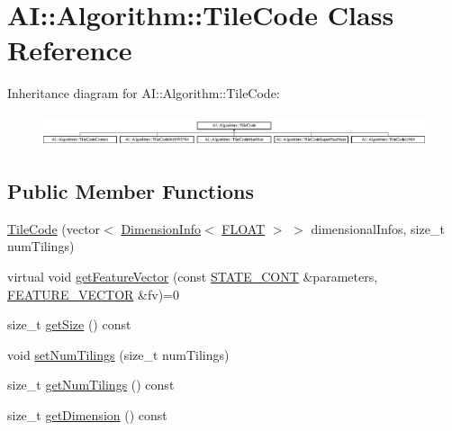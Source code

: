 \hypertarget{classAI_1_1Algorithm_1_1TileCode}{\section{A\-I\-:\-:Algorithm\-:\-:Tile\-Code Class Reference}
\label{classAI_1_1Algorithm_1_1TileCode}
}
Inheritance diagram for A\-I\-:\-:Algorithm\-:\-:Tile\-Code\-:\begin{figure}[H]
\begin{center}
\leavevmode
\includegraphics[height=0.957265cm]{classAI_1_1Algorithm_1_1TileCode}
\end{center}
\end{figure}
\subsection*{Public Member Functions}
\begin{DoxyCompactItemize}
\item 
\hyperlink{classAI_1_1Algorithm_1_1TileCode_a5c143dc170aca9699e68c808d91f1ffe}{Tile\-Code} (vector$<$ \hyperlink{classAI_1_1Algorithm_1_1DimensionInfo}{Dimension\-Info}$<$ \hyperlink{namespaceAI_a41b74884a20833db653dded3918e05c3}{F\-L\-O\-A\-T} $>$ $>$ dimensional\-Infos, size\-\_\-t num\-Tilings)
\item 
virtual void \hyperlink{classAI_1_1Algorithm_1_1TileCode_ad2ba639c550e7d267d066e54b20f6000}{get\-Feature\-Vector} (const \hyperlink{namespaceAI_aff63ec21d97dd5f086fddbc3103f5707}{S\-T\-A\-T\-E\-\_\-\-C\-O\-N\-T} \&parameters, \hyperlink{namespaceAI_a23a39e1b301a5c1345fa508796940631}{F\-E\-A\-T\-U\-R\-E\-\_\-\-V\-E\-C\-T\-O\-R} \&fv)=0
\item 
size\-\_\-t \hyperlink{classAI_1_1Algorithm_1_1TileCode_a3d757b2d7e6cf273c54f007230b69406}{get\-Size} () const 
\item 
void \hyperlink{classAI_1_1Algorithm_1_1TileCode_aad4bf93d21b47fe00c8e64957157dca1}{set\-Num\-Tilings} (size\-\_\-t num\-Tilings)
\item 
size\-\_\-t \hyperlink{classAI_1_1Algorithm_1_1TileCode_a540d24d750bf47835ed950b4ef54486a}{get\-Num\-Tilings} () const 
\item 
size\-\_\-t \hyperlink{classAI_1_1Algorithm_1_1TileCode_aa80f909ef2bf2039c4ea7b468bf796a5}{get\-Dimension} () const 
\end{DoxyCompactItemize}
